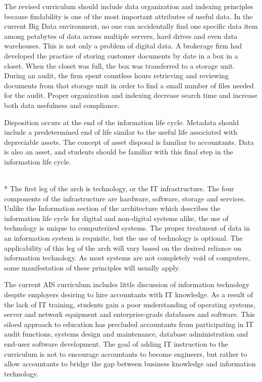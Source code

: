 \documentclass[12pt]{article}
\newcommand{\SubSection}[1]{\vspace{.15in}{\centering{}\normalsize{}\textbf{#1}}\\*\indent{}}
\begin{document}
The revised curriculum should include data organization and indexing principles because findability is one of the most important attributes of useful data. In the current Big Data environment, no one can accidentally find one specific data item among petabytes of data across multiple servers, hard drives and even data warehouses. This is not only a problem of digital data. A brokerage firm had developed the practice of storing customer documents by date in a box in a closet. When the closet was full, the box was transferred to a storage unit. During an audit, the firm spent countless hours retrieving and reviewing documents from that storage unit in order to find a small number of files needed for the audit. Proper organization and indexing decrease search time and increase both data usefulness and compliance.

Disposition occurs at the end of the information life cycle. Metadata should include a predetermined end of life similar to the useful life associated with depreciable assets. The concept of asset disposal is familiar to accountants. Data is also an asset, and students should be familiar with this final step in the information life cycle.

\SubSection{Technology}
The first leg of the arch is technology, or the IT infrastructure. The four components of the infrastructure are hardware, software, storage and services. Unlike the Information section of the architecture which describes the information life cycle for digital and non-digital systems alike, the use of technology is unique to computerized systems. The proper treatment of data in an information system is requisite, but the use of technology is optional. The applicability of this leg of the arch will vary based on the desired reliance on information technology. As most systems are not completely void of computers, some manifestation of these principles will usually apply.

The current AIS curriculum includes little discussion of information technology despite employers desiring to hire accountants with IT knowledge. As a result of the lack of IT training, students gain a poor understanding of operating systems, server and network equipment and enterprise-grade databases and software. This siloed approach to education has precluded accountants from participating in IT audit functions, systems design and maintenance, database administration and end-user software development. The goal of adding IT instruction to the curriculum is not to encourage accountants to become engineers, but rather to allow accountants to bridge the gap between business knowledge and information technology.
\end{document}
